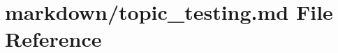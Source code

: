 \hypertarget{topic__testing_8md}{}\section{markdown/topic\+\_\+testing.md File Reference}
\label{topic__testing_8md}
